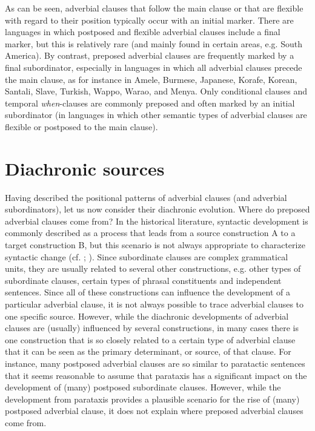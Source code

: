 \documentclass[output=paper]{langsci/langscibook}
\begin{document}
As can be seen, adverbial clauses that follow the main clause or that are flexible with regard to their position typically occur with an initial marker. There are languages in which postposed and flexible adverbial clauses include a final marker, but this is relatively rare (and mainly found in certain areas, e.g. South America). By contrast, preposed adverbial clauses are frequently marked by a final subordinator, especially in languages in which all adverbial clauses precede the main clause, as for instance in Amele, Burmese, Japanese, Korafe, Korean, Santali, Slave, Turkish, Wappo, Warao, and Menya. Only conditional clauses and temporal \textit{when}-clauses are commonly preposed and often marked by an initial subordinator (in languages in which other semantic types of adverbial clauses are flexible or postposed to the main clause). 

\section{Diachronic sources}

Having described the positional patterns of adverbial clauses (and adverbial subordinators), let us now consider their diachronic evolution. Where do preposed adverbial clauses come from? In the historical literature, syntactic development is commonly described as a process that leads from a source construction A to a target construction B, but this scenario is not always appropriate to characterize syntactic change (cf. \citealt{Givón1991};  \citealt{VandeVeldeEtAl2013}). Since subordinate clauses are complex grammatical units, they are usually related to several other constructions, e.g. other types of subordinate clauses, certain types of phrasal constituents and independent sentences. Since all of these constructions can influence the development of a particular adverbial clause, it is not always possible to trace adverbial clauses to one specific source. However, while the diachronic developments of adverbial clauses are (usually) influenced by several constructions, in many cases there is one construction that is so closely related to a certain type of adverbial clause that it can be seen as the primary determinant, or source, of that clause. For instance, many postposed adverbial clauses are so similar to paratactic sentences that it seems reasonable to assume that parataxis has a significant impact on the development of (many) postposed subordinate clauses. However, while the development from parataxis provides a plausible scenario for the rise of (many) postposed adverbial clause, it does not explain where preposed adverbial clauses come from.
\end{document}
